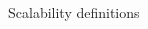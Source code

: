 \begin{frame}{Scalability definitions}
\begin{columns}
\begin{column}{0.5\textwidth}
    \end{column}
  \end{columns}
\end{frame}
